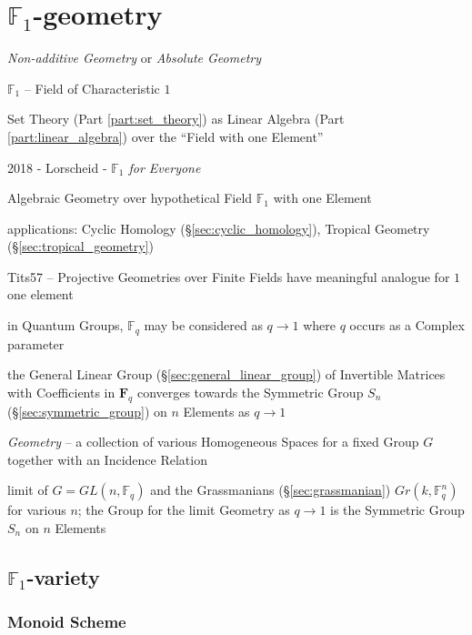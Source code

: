 \section{$\mathbb{F}_1$-geometry}\label{sec:f1_geometry}

\emph{Non-additive Geometry} or \emph{Absolute Geometry}

$\mathbb{F}_1$ -- Field of Characteristic $1$

Set Theory (Part \ref{part:set_theory}) as Linear Algebra (Part
\ref{part:linear_algebra}) over the ``Field with one Element''

2018 - Lorscheid - \emph{$\mathbb{F}_1$ for Everyone}

Algebraic Geometry over hypothetical Field $\mathbb{F}_1$ with one Element

applications: Cyclic Homology (\S\ref{sec:cyclic_homology}), Tropical Geometry
(\S\ref{sec:tropical_geometry})

Tits57 -- Projective Geometries over Finite Fields have meaningful analogue for
$1$ one element

in Quantum Groups, $\mathbb{F}_q$ may be considered as $q \rightarrow 1$ where
$q$ occurs as a Complex parameter

the General Linear Group (\S\ref{sec:general_linear_group}) of Invertible
Matrices with Coefficients in $\mathbf{F}_q$ converges towards the Symmetric
Group $S_n$ (\S\ref{sec:symmetric_group}) on $n$ Elements as $q \rightarrow 1$

\emph{Geometry} -- a collection of various Homogeneous Spaces for a fixed Group
$G$ together with an Incidence Relation

limit of $G = GL(n,\mathbb{F}_q)$ and the Grassmanians (\S\ref{sec:grassmanian})
$Gr(k,\mathbb{F}^n_q)$ for various $n$; the Group for the limit Geometry as
$q \rightarrow 1$ is the Symmetric Group $S_n$ on $n$ Elements



\subsection{$\mathbb{F}_1$-variety}\label{sec:f1_variety}

\subsubsection{Monoid Scheme}\label{sec:monoid_scheme}

